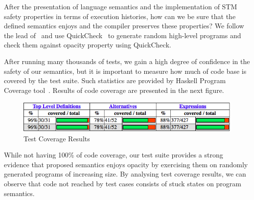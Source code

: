 \documentclass[sigplan]{acmart}
\theoremstyle{definition}
\begin{document}
After the presentation of language semantics and the implementation of
STM safety properties in terms of execution histories, how can we
be sure that the defined semantics enjoys and the compiler preserves these
properties? We follow the lead of~\cite{Hu08} and use QuickCheck~\cite{Claessen00} to
generate random high-level programs and check them against opacity property using QuickCheck.

After running many thousands of tests, we gain a high degree of confidence in the safety of our semantics, but it is
important to measure how much of code base is covered by the test suite. Such statistics are provided by Haskell Program Coverage
tool~\cite{Gill2007}. Results of code coverage are presented in the next figure.

\begin{figure}[!htb]
\centering
\includegraphics[scale=0.38]{coverage.png}
\caption{Test Coverage Results}
\label{fig:test-coverage}
\end{figure}
While not having 100\% of code coverage, our test suite provides a strong evidence that proposed semantics enjoys
opacity by exercising them on randomly generated programs of increasing size. By analysing test coverage
results, we can observe that code not reached by test cases consists of stuck states on program semantics.
\end{document}
